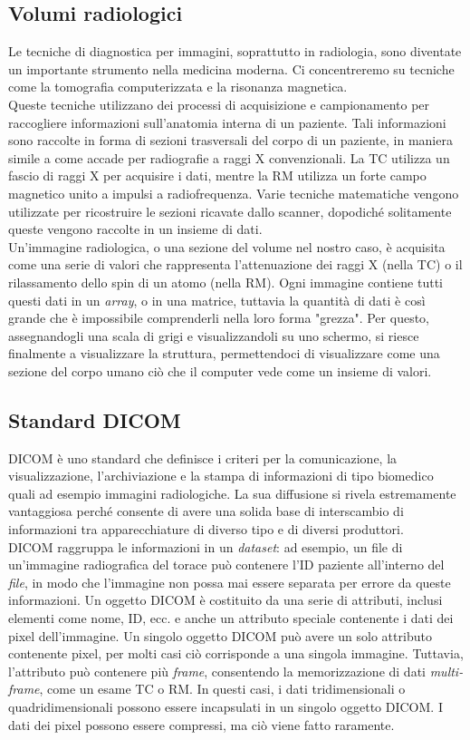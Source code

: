 \subsection{Volumi radiologici}\label{sec:volumi-radiologici}
Le tecniche di diagnostica per immagini, soprattutto in radiologia, sono diventate un importante strumento nella medicina moderna. Ci concentreremo su tecniche come la tomografia computerizzata e la risonanza magnetica.
\\
Queste tecniche utilizzano dei processi di acquisizione e campionamento per raccogliere informazioni sull'anatomia interna di un paziente. Tali informazioni sono raccolte in forma di sezioni trasversali del corpo di un paziente, in maniera simile a come accade per radiografie a raggi X convenzionali. La TC utilizza un fascio di raggi X per acquisire i dati, mentre la RM utilizza un forte campo magnetico unito a  impulsi a radiofrequenza. Varie tecniche matematiche vengono utilizzate per ricostruire le sezioni ricavate dallo scanner, dopodiché solitamente queste vengono raccolte in un insieme di dati.
\\
Un'immagine radiologica, o una sezione del volume nel nostro caso, è acquisita come una serie di valori che rappresenta l'attenuazione dei raggi X (nella TC) o il rilassamento dello spin di un atomo (nella RM). Ogni immagine contiene tutti questi dati in un \emph{array}, o in una matrice, tuttavia la quantità di dati è così grande che è impossibile comprenderli nella loro forma "grezza". Per questo, assegnandogli una scala di grigi e visualizzandoli su uno schermo, si riesce finalmente a visualizzare la struttura, permettendoci di visualizzare come una sezione del corpo umano ciò che il computer vede come un insieme di valori.

\subsection{Standard DICOM}
DICOM è uno standard che definisce i criteri per la comunicazione, la visualizzazione, l'archiviazione e la stampa di informazioni di tipo biomedico quali ad esempio immagini radiologiche. La sua diffusione si rivela estremamente vantaggiosa perché consente di avere una solida base di interscambio di informazioni tra apparecchiature di diverso tipo e di diversi produttori.
\\
DICOM raggruppa le informazioni in un \emph{dataset}: ad esempio, un file di un'immagine radiografica del torace può contenere l'ID paziente all'interno del \emph{file}, in modo che l'immagine non possa mai essere separata per errore da queste informazioni. Un oggetto DICOM è costituito da una serie di attributi, inclusi elementi come nome, ID, ecc. e anche un attributo speciale contenente i dati dei pixel dell'immagine. Un singolo oggetto DICOM può avere un solo attributo contenente pixel, per molti casi ciò corrisponde a una singola immagine. Tuttavia, l'attributo può contenere più \emph{frame}, consentendo la memorizzazione di dati \emph{multi-frame}, come un esame TC o RM. In questi casi, i dati tridimensionali o quadridimensionali possono essere incapsulati in un singolo oggetto DICOM. I dati dei pixel possono essere compressi, ma ciò viene fatto raramente.

